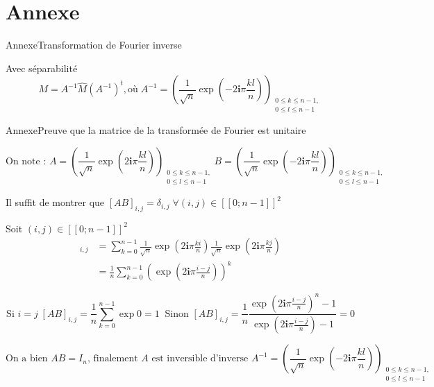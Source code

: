 \section{Annexe}

\begin{frame}{Annexe}{Transformation de Fourier inverse}
    \begin{block}{Avec séparabilité}
        \[M = A^{-1}\widehat{M}(A^{-1})^t, \textrm{où} \; A^{-1} = {\left(\frac{1}{\sqrt{n}}\exp\left(-2\mathbf{i}\pi\frac{kl}{n}\right)\right)}_{\substack{0 \leqslant k \leqslant n-1,\\ 0 \leqslant l \leqslant n-1}}\]
    \end{block}
\end{frame}

\begin{frame}{Annexe}{Preuve que la matrice de la transformée de Fourier est unitaire}
    \footnotesize{
        \[{\textrm{On note : } A = \left(\frac{1}{\sqrt{n}}\exp\left(2\mathbf{i}\pi\frac{kl}{n}\right)\right)}_{\substack{0 \leqslant k \leqslant n-1,\\ 0 \leqslant l \leqslant n-1}}
        B = {\left(\frac{1}{\sqrt{n}}\exp\left(-2\mathbf{i}\pi\frac{kl}{n}\right)\right)}_{\substack{0 \leqslant k \leqslant n-1,\\ 0 \leqslant l \leqslant n-1}}\]

        Il suffit de montrer que \([AB]_{i,j} = \delta_{i,j} \;\forall (i,j) \in [\![0;n-1]\!]^2 \)

        Soit \((i,j) \in [\![0;n-1]\!]^2 \)
        \begin{align*}
            [AB]_{i,j} &= \sum_{k=0}^{n-1} \frac{1}{\sqrt{n}}\exp\left(2\mathbf{i}\pi\frac{ki}{n}\right)\frac{1}{\sqrt{n}}\exp\left(2\mathbf{i}\pi\frac{kj}{n}\right)\\
            &= \frac{1}{n}\sum_{k=0}^{n-1}\left(\exp\left(2\mathbf{i}\pi\frac{i-j}{n}\right)\right)^k
        \end{align*}

        
        \[\textrm{Si } i = j\; [AB]_{i,j} = \frac{1}{n}\sum_{k=0}^{n-1} \exp{0} = 1 \;\;
        \textrm{Sinon } [AB]_{i,j} = \frac{1}{n}\frac{\exp\left(2\mathbf{i}\pi\frac{i-j}{n}\right)^n - 1}{\exp\left(2\mathbf{i}\pi\frac{i-j}{n}\right) - 1} = 0\]

        
        \[\textrm{On a bien } AB = I_n \textrm{, finalement } A \textrm{ est inversible d'inverse }  A^{-1} = {\left(\frac{1}{\sqrt{n}}\exp\left(-2\mathbf{i}\pi\frac{kl}{n}\right)\right)}_{\substack{0 \leqslant k \leqslant n-1,\\ 0 \leqslant l \leqslant n-1}}\]
    }
\end{frame}

